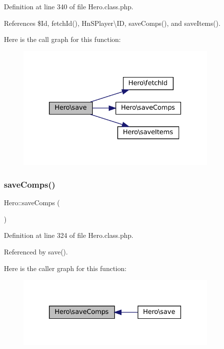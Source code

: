 Definition at line 340 of file Hero.\+class.\+php.



References \$\+Id, fetch\+Id(), Hn\+S\+Player\textbackslash{}\+ID, save\+Comps(), and save\+Items().

Here is the call graph for this function\+:\nopagebreak
\begin{figure}[H]
\begin{center}
\leavevmode
\includegraphics[width=282pt]{class_hero_af901d5ac2e1b888eacef95d42f07a4d8_cgraph}
\end{center}
\end{figure}
\mbox{\label{class_hero_a723f83bed9d55248a97b392739402d3a}} 
\subsubsection{\texorpdfstring{save\+Comps()}{saveComps()}}
{\footnotesize\ttfamily Hero\+::save\+Comps (\begin{DoxyParamCaption}{ }\end{DoxyParamCaption})\hspace{0.3cm}{\ttfamily [private]}}



Definition at line 324 of file Hero.\+class.\+php.



Referenced by save().

Here is the caller graph for this function\+:\nopagebreak
\begin{figure}[H]
\begin{center}
\leavevmode
\includegraphics[width=282pt]{class_hero_a723f83bed9d55248a97b392739402d3a_icgraph}
\end{center}
\end{figure}
\mbox{\label{class_hero_a4e38d5d658b70461a8380aeb69fdc9d5}} 
